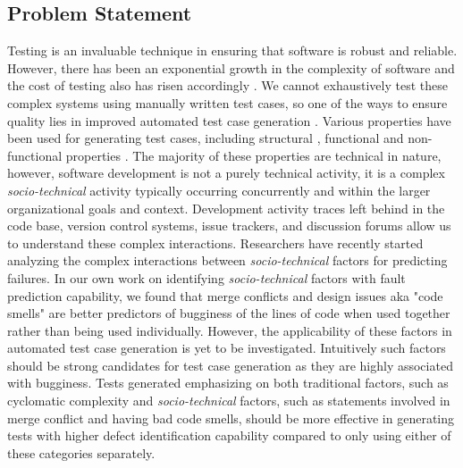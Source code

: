 \documentclass[10pt]{article}
\begin{document}
\subsection{Problem Statement}
Testing is an invaluable technique in ensuring that software is robust and reliable. However, there has been an exponential growth in the complexity of software and the cost of testing also has risen accordingly \cite{myers2011art}. We cannot exhaustively test these complex systems using manually written test cases, so one of the ways to ensure quality lies in improved automated test case generation \cite{anand2013orchestrated,harman2012search}. Various properties have been used for generating test cases, including
structural \cite{tonella2004evolutionary}, functional \cite{wegener2004evaluation} and non-functional properties \cite{wegener1998verifying}. The majority of these properties are technical in nature, however, software development is not a purely technical activity, it is a complex \emph{socio-technical} activity typically occurring concurrently and within the larger organizational goals and context. Development activity traces left behind in the code base, version control systems, issue trackers, and discussion forums allow us to understand these complex interactions. Researchers have recently started analyzing the complex interactions between \emph{socio-technical} factors for predicting failures. In our own work on identifying \emph{socio-technical} factors with fault prediction capability, we found that merge conflicts and design issues aka "code smells" are better predictors of bugginess of the lines of code \cite{ahmedempirical} when used together rather than being used individually. However, the applicability of these factors in automated test case generation is yet to be investigated. Intuitively such factors should be strong candidates for test case generation as they are highly associated with bugginess. Tests generated emphasizing on both traditional factors, such as cyclomatic complexity and \emph{socio-technical} factors, such as statements involved in merge conflict and having bad code smells, should be more effective in generating tests with higher defect identification capability compared to only using either of these categories separately.

\end{document}
